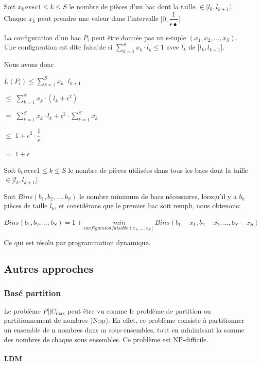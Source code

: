 \documentclass[a4paper,12pt]{report}
\theoremstyle{plain}				%
\theoremstyle{definition}				%
\newcommand\problemGrahamP{$P||C_{\max}$\xspace}
\begin{document}
Soit $x_k avec 1 \le k \le S$ le nombre de pièces d'un bac dont la
taille $\in ]l_k, l_{k+1}]$.
Chaque $x_k$ peut prendre une valeur dans l'intervalle
$[0,\dfrac{1}{\epsilon•}[$

La configuration d'un bac $P_i$ peut être donnée pas un s-tuple $(x_1, x_2, \ldots, x_S)$.
Une configuration est dite faisable si $\sum_{k=1}^{S}x_k \cdot l_k \le 1$ avec $l_k$ de $]l_k, l_{k+1}]$.

Nous avons donc

$L(P_i) \le \sum_{k=1}^{S}x_k \cdot l_{k+1}$

$\le$
$\sum_{k=1}^{S}x_k \cdot (l_k+\epsilon^2)$

$=$
$\sum_{k=1}^{S}x_k \cdot l_k  +  \epsilon^2 \cdot \sum_{k=1}^{S}x_k$

$\le$
$1 + \epsilon^2 \cdot \dfrac{1}{\epsilon}$

$=$
$1 + \epsilon$

\bigskip
Soit $b_k avec 1 \le k \le S$ le nombre de pièces utilisées dans tous les bacs dont la taille $\in ]l_k, l_{k+1}]$.

Soit $Bins(b_1, b_2, \ldots, b_S)$ le nombre minimum de bacs
nécessaires, lorsqu'il y a $b_k$ pièces de taille $l_k$, et
considérons que le premier bac soit rempli, nous obtenons:

$Bins(b_1, b_2, \ldots, b_S) = 1 + \underset{configuraion faisable (x_1, \ldots, x_S)}{min} Bins(b_1-x_1, b_2-x_2, \ldots, b_S-x_S)$

Ce qui est résolu par programmation dynamique.




\bigskip


\subsection{Autres approches}

\subsubsection{Basé partition}
Le problème \problemGrahamP peut être vu comme le problème de partition ou partitionnement de nombres (Npp). 
En effet, ce problème consiste à partitionner un ensemble de n nombres dans m sous-ensembles, 
tout en minimisant la somme des nombres de chaque sous ensembles.
Ce problème est NP-difficile.  

\paragraph{LDM}
\end{document}
